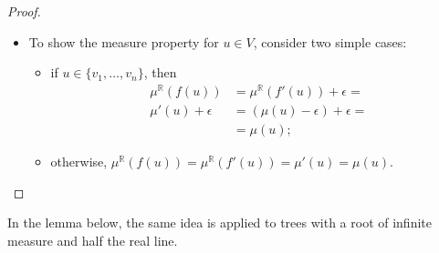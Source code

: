 \documentclass{article}
\newcommand{\R}{\mathbb{R}}
\begin{document}
\begin{proof}
\begin{itemize}
\begin{itemize}
    \item To show the measure property for $u \in V$, consider two simple cases:
      \begin{itemize}
      \item if $u \in \{v_1, \dots, v_n\}$, then
        \begin{align*}
          \mu^\R(f(u)) &= \mu^\R(f'(u)) + \epsilon = \\
          \mu'(u) + \epsilon &= (\mu(u) - \epsilon) + \epsilon = \\
          &= \mu(u);
        \end{align*}
      \item otherwise, $\mu^\R(f(u)) = \mu^\R(f'(u)) = \mu'(u) = \mu(u)$.
      \end{itemize}
    \end{itemize}
  \end{itemize}
\end{proof}

In the lemma below, the same idea is applied to trees with a root of infinite measure and half the real line.
\end{document}
